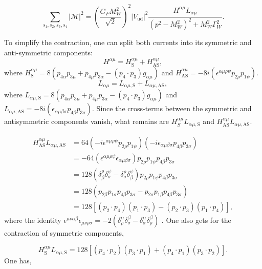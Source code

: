 \documentclass[a4paper,11pt]{article}
\begin{document}
\begin{equation}\label{spin-sum-sq-full-amp}
	\sum_{s_1,s_2,s_3,s_4}|\mathcal{M}|^2 = 	\left(\frac{G_FM_W^2}{\sqrt{2}}\right)^2|V_\text{ud}|^2 \frac{H^{\alpha \mu}L_{\alpha \mu}}{(p^2-M_W^2)^2 +M_W^2\Gamma_W^2}.
\end{equation}

To simplify the contraction, one can split both currents into its symmetric and anti-symmetric components: $$H^{\alpha \mu} = H^{\alpha \mu}_\text{S} + H^{\alpha \mu}_{\text{AS}},$$ where $H^{\alpha \mu}_\text{S} =8 \left(p_{4\alpha} p_{3\mu} + p_{4\mu} p_{3\alpha} - (p_4 \cdot p_3) g_{\alpha \mu}\right) $ and $H^{\alpha \mu}_{\text{AS}} = - 8i\left( \epsilon^{\alpha \mu \rho \psi}p_{2\rho}p_{1\psi}\right)$.  $$L_{\alpha \mu} = L_{\alpha \mu, \text{S}} + L_{\alpha \mu,\text{AS}},$$ where $L_{\alpha \mu, \text{S}} = 8\left(p_{4\alpha} p_{3\mu} + p_{4\mu} p_{3\alpha} - (p_4 \cdot p_3) g_{\alpha \mu} \right)$ and $L_{\alpha \mu,\text{AS}} = - 8i\left(\epsilon_{\alpha \mu \beta \sigma}p_{4\beta}p_{3\sigma} \right).$
Since the cross-terms between the symmetric and antisymmetric components vanish, what remains are $H^{\alpha \mu}_S L_{ \alpha \mu,\text{S}}$ and $H^{\alpha \mu}_\text{AS}L_{\alpha \mu, \text{AS}}.$

\begin{equation}
	\begin{aligned}
		H^{\alpha \mu}_\text{AS}L_{\alpha \mu, \text{AS}} &= 64(- i \epsilon^{\alpha \mu \rho \psi}p_{2\rho}p_{1\psi})( - i \epsilon_{\alpha \mu \beta \sigma}p_{4\beta}p_{3\sigma})\\
		&=-64(\epsilon^{\alpha\mu\rho\psi}\epsilon_{\alpha\mu\beta\sigma})p_{2\rho}p_{1\psi}p_{4\beta}p_{3\sigma}\\
		&= 128(\delta^\rho_\beta \delta^\psi_\sigma - \delta^\rho_\sigma \delta^\psi_\beta) p_{2\rho}p_{1\psi}p_{4\beta}p_{3\sigma}\\
		&= 128 (p_{2\beta}p_{1\sigma}p_{4\beta}p_{3\sigma} - p_{2\sigma}p_{1\beta}p_{4\beta}p_{3\sigma})\\
		&= 128 \left[(p_2 \cdot p_4) (p_1 \cdot p_3) - (p_2 \cdot p_3)(p_1 \cdot p_4)\right],
	\end{aligned}
\end{equation}
where the identity $\epsilon^{\mu \nu \alpha \beta}\epsilon_{\mu \nu \rho \sigma} = -2(\delta^\alpha_\rho \delta^\beta_\sigma - \delta^\alpha_\sigma \delta^\beta_\rho)$ \cite{Barger:2019ydb}. One also gets for the contraction of symmetric components,

$$ 
H^{\alpha \mu}_\text{S}L_{\alpha \mu, \text{S}} = 128\left[(p_4 \cdot p_2)(p_3 \cdot p_1)+(p_4 \cdot p_1)(p_3 \cdot p_2)   \right].
$$
 One has,
 
\end{document}
